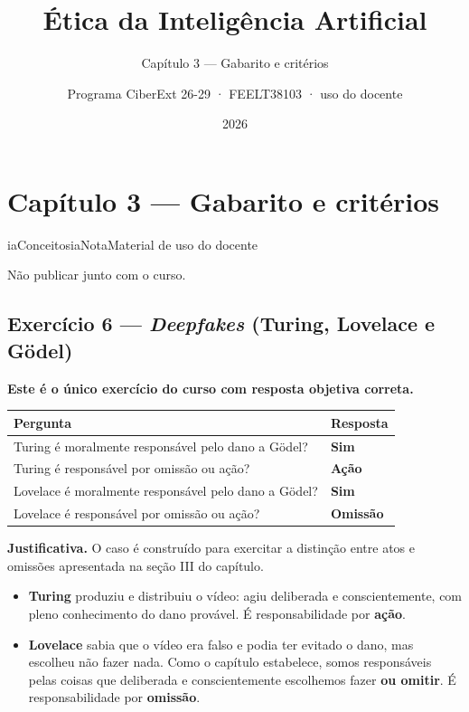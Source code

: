\documentclass[
  11pt,
]{article}
\title{Ética da Inteligência Artificial}
\subtitle{Capítulo 3 --- Gabarito e critérios}
\author{Programa CiberExt 26-29 · FEELT38103 · uso do docente}
\date{2026}
\providecommand{\tightlist}{%
  \setlength{\itemsep}{0pt}\setlength{\parskip}{0pt}}
\newenvironment{nota}[1][Nota]{\begin{iabox}{iaConceitos}{iaNota}{#1}}{\end{iabox}}
\begin{document}
\maketitle

{
\hypersetup{linkcolor=iaConceitos}
\setcounter{tocdepth}{2}
\tableofcontents
}
\hypertarget{capuxedtulo-3-gabarito-e-crituxe9rios}{%
\section{Capítulo 3 --- Gabarito e
critérios}\label{capuxedtulo-3-gabarito-e-crituxe9rios}}

\begin{nota}[Material de uso do docente]

Não publicar junto com o curso.

\end{nota}

\hypertarget{exercuxedcio-6-deepfakes-turing-lovelace-e-guxf6del}{%
\subsection{\texorpdfstring{Exercício 6 --- \emph{Deepfakes} (Turing,
Lovelace e
Gödel)}{Exercício 6 --- Deepfakes (Turing, Lovelace e Gödel)}}\label{exercuxedcio-6-deepfakes-turing-lovelace-e-guxf6del}}

\textbf{Este é o único exercício do curso com resposta objetiva
correta.}

\begin{longtable}[]{@{}ll@{}}
\toprule\noalign{}
Pergunta & Resposta \\
\midrule\noalign{}
\endhead
\bottomrule\noalign{}
\endlastfoot
Turing é moralmente responsável pelo dano a Gödel? & \textbf{Sim} \\
Turing é responsável por omissão ou ação? & \textbf{Ação} \\
Lovelace é moralmente responsável pelo dano a Gödel? & \textbf{Sim} \\
Lovelace é responsável por omissão ou ação? & \textbf{Omissão} \\
\end{longtable}

\textbf{Justificativa.} O caso é construído para exercitar a distinção
entre atos e omissões apresentada na seção III do capítulo.

\begin{itemize}
\tightlist
\item
  \textbf{Turing} produziu e distribuiu o vídeo: agiu deliberada e
  conscientemente, com pleno conhecimento do dano provável. É
  responsabilidade por \textbf{ação}.
\item
  \textbf{Lovelace} sabia que o vídeo era falso e podia ter evitado o
  dano, mas escolheu não fazer nada. Como o capítulo estabelece, somos
  responsáveis pelas coisas que deliberada e conscientemente escolhemos
  fazer \textbf{ou omitir}. É responsabilidade por \textbf{omissão}.
\end{itemize}
\end{document}
